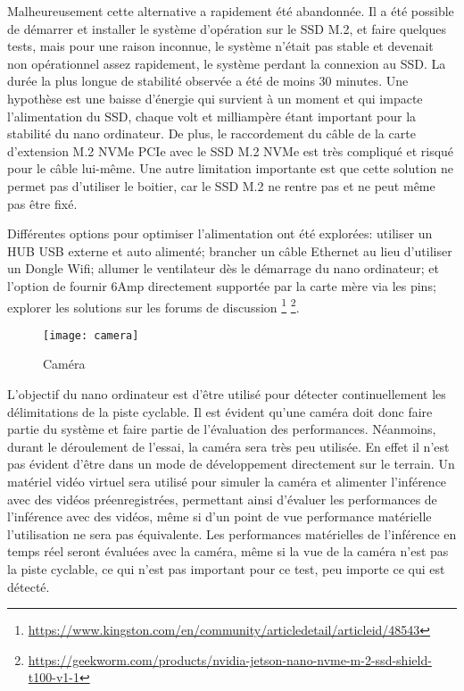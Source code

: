 \par Malheureusement cette alternative a rapidement été abandonnée. Il a été possible de démarrer et installer le système d'opération sur le SSD M.2, et faire quelques tests, mais pour une raison inconnue, le système n'était pas stable et devenait non opérationnel assez rapidement, le système perdant la connexion au SSD. La durée la plus longue de stabilité observée a été de moins 30 minutes. Une hypothèse est une baisse d'énergie qui survient à un moment et qui impacte l'alimentation du SSD, chaque volt et milliampère étant important pour la stabilité du nano ordinateur. De plus, le raccordement du câble de la carte d'extension M.2 NVMe PCIe avec le SSD M.2 NVMe est très compliqué et risqué pour le câble lui-même. Une autre limitation importante est que cette solution ne permet pas d'utiliser le boitier, car le SSD M.2 ne rentre pas et ne peut même pas être fixé. 
\par Différentes options pour optimiser l'alimentation ont été explorées: utiliser un HUB USB externe et auto alimenté; brancher un câble Ethernet au lieu d'utiliser un Dongle Wifi; allumer le ventilateur dès le démarrage du nano ordinateur; et l'option de fournir 6Amp directement supportée par la carte mère via les pins; explorer les solutions sur les forums de discussion \footnote{\url{https://www.kingston.com/en/community/articledetail/articleid/48543}} \footnote{\url{https://geekworm.com/products/nvidia-jetson-nano-nvme-m-2-ssd-shield-t100-v1-1}}.
\begin{figure}[H]
    \centering
    \texttt{[image: camera]}
    \caption{Caméra}
    \label{fig:camera}
\end{figure}
\par L'objectif du nano ordinateur est d'être utilisé pour détecter continuellement les délimitations de la piste cyclable. Il est évident qu'une caméra doit donc faire partie du système et faire partie de l'évaluation des performances. Néanmoins, durant le déroulement de l'essai, la caméra sera très peu utilisée. En effet il n'est pas évident d'être dans un mode de développement directement sur le terrain. Un matériel vidéo virtuel sera utilisé pour simuler la caméra et alimenter l'inférence avec des vidéos préenregistrées, permettant ainsi d'évaluer les performances de l'inférence avec des vidéos, même si d'un point de vue performance matérielle l'utilisation ne sera pas équivalente. Les performances matérielles de l'inférence en temps réel seront évaluées avec la caméra, même si la vue de la caméra n'est pas la piste cyclable, ce qui n'est pas important pour ce test, peu importe ce qui est détecté. 

